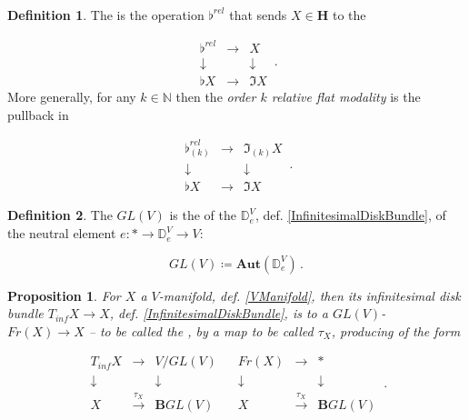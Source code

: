 \documentclass[12pt,titlepage]{article}
\newcommand{\itexarray}[1]{\begin{matrix}#1\end{matrix}}
\theoremstyle{plain}
\newtheorem{prop}{Proposition}
\theoremstyle{definition}
\newtheorem{defn}{Definition}
\theoremstyle{remark}
\begin{document}
\begin{defn}
\label{RelativeFlat}\hypertarget{RelativeFlat}{}
The  is the operation $\flat^{rel}$ that sends $X \in \mathbf{H}$ to the 

\begin{displaymath}
\itexarray{
    \flat^{rel} &\longrightarrow& X
    \\
    \downarrow && \downarrow
    \\
    \flat X &\longrightarrow& \Im X
  }
  \,.
\end{displaymath}
More generally, for any $k \in \mathbb{N}$ then the \emph{order $k$ relative flat modality} is the pullback in

\begin{displaymath}
\itexarray{
    \flat^{rel}_{(k)} &\longrightarrow& \Im_{(k)} X
    \\
    \downarrow && \downarrow
    \\
    \flat X &\longrightarrow& \Im X
  }
  \,.
\end{displaymath}
\end{defn}
\begin{defn}
\label{GeneralLinearGroup}\hypertarget{GeneralLinearGroup}{}
The  $GL(V)$ is the  of the  $\mathbb{D}^V_e$, def. \ref{InfinitesimalDiskBundle}, of the neutral element $e \colon \ast \to \mathbb{D}^V_e \to V$:

\begin{displaymath}
GL(V) \coloneqq \mathbf{Aut}(\mathbb{D}^V_e)
  \,.
\end{displaymath}
\end{defn}
\begin{prop}
\label{FrameBundle}\hypertarget{FrameBundle}{}
For $X$ a $V$-manifold, def. \ref{VManifold}, then its infinitesimal disk bundle $T_{inf} X \to X$, def. \ref{InfinitesimalDiskBundle}, is  to a $GL(V)$- $Fr(X) \to X$ -- to be called the ,  by a map to be called $\tau_X$, producing  of the form

\begin{displaymath}
\itexarray{
     T_{inf} X &\longrightarrow& V/GL(V)
     \\
     \downarrow && \downarrow
     \\
     X &\stackrel{\tau_X}{\longrightarrow}& \mathbf{B} GL(V)
  }
  \;\;\;
  \itexarray{
     Fr(X) &\longrightarrow& \ast
     \\
     \downarrow && \downarrow
     \\
     X &\stackrel{\tau_X}{\longrightarrow}& \mathbf{B} GL(V)
  }
  \,.
\end{displaymath}
\end{prop}
\end{document}
